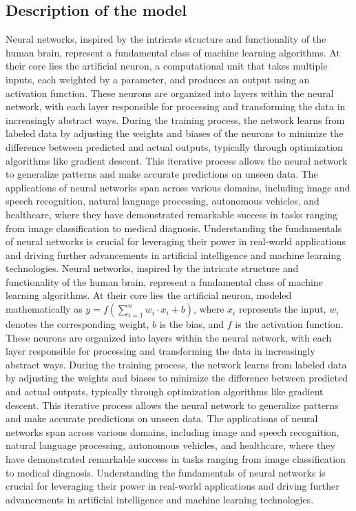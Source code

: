 \documentclass[10pt]{article} %
\begin{document}
    \subsection{Description of the model}
    Neural networks, inspired by the intricate structure and functionality of the human brain, represent a fundamental class of machine learning algorithms. At their core lies the artificial neuron, a computational unit that takes multiple inputs, each weighted by a parameter, and produces an output using an activation function. These neurons are organized into layers within the neural network, with each layer responsible for processing and transforming the data in increasingly abstract ways. During the training process, the network learns from labeled data by adjusting the weights and biases of the neurons to minimize the difference between predicted and actual outputs, typically through optimization algorithms like gradient descent. This iterative process allows the neural network to generalize patterns and make accurate predictions on unseen data. The applications of neural networks span across various domains, including image and speech recognition, natural language processing, autonomous vehicles, and healthcare, where they have demonstrated remarkable success in tasks ranging from image classification to medical diagnosis. Understanding the fundamentals of neural networks is crucial for leveraging their power in real-world applications and driving further advancements in artificial intelligence and machine learning technologies.
    Neural networks, inspired by the intricate structure and functionality of the human brain, represent a fundamental class of machine learning algorithms. At their core lies the artificial neuron, modeled mathematically as $y = f\left(\sum_{i=1}^{n} w_i \cdot x_i + b\right)$, where $x_i$ represents the input, $w_i$ denotes the corresponding weight, $b$ is the bias, and $f$ is the activation function. These neurons are organized into layers within the neural network, with each layer responsible for processing and transforming the data in increasingly abstract ways. During the training process, the network learns from labeled data by adjusting the weights and biases to minimize the difference between predicted and actual outputs, typically through optimization algorithms like gradient descent. This iterative process allows the neural network to generalize patterns and make accurate predictions on unseen data. The applications of neural networks span across various domains, including image and speech recognition, natural language processing, autonomous vehicles, and healthcare, where they have demonstrated remarkable success in tasks ranging from image classification to medical diagnosis. Understanding the fundamentals of neural networks is crucial for leveraging their power in real-world applications and driving further advancements in artificial intelligence and machine learning technologies.
      
\end{document}
